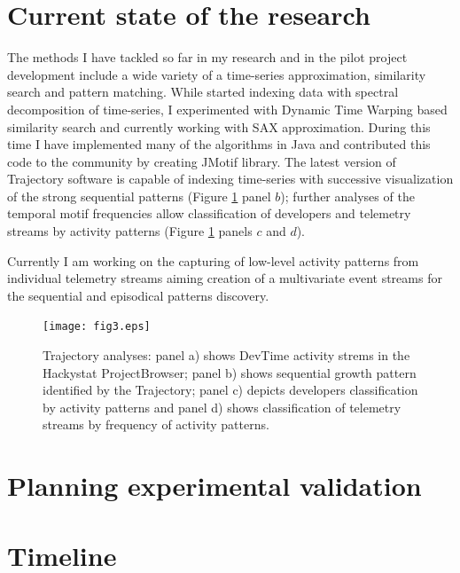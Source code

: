 \documentclass[11pt,oneside]{article}
\begin{document}
\section{Current state of the research}
The methods I have tackled so far in my research and in the pilot project development include a wide variety of a time-series approximation, similarity search and pattern matching. While started indexing data with spectral decomposition of time-series, I experimented with Dynamic Time Warping based similarity search and currently working with SAX approximation. During this time I have implemented many of the algorithms in Java and contributed this code to the community by creating JMotif library. The latest version of Trajectory software is capable of indexing time-series with successive visualization of the strong sequential patterns (Figure \ref{fig:fig3} panel $b$); further analyses of the temporal motif frequencies allow classification of developers and telemetry streams by activity patterns (Figure \ref{fig:fig3} panels $c$ and $d$). 

Currently I am working on the capturing of low-level activity patterns from individual telemetry streams aiming creation of a multivariate event streams for the sequential and episodical patterns discovery.

\begin{figure}[tbp]
   \centering
   \texttt{[image: fig3.eps]}
   \caption{Trajectory analyses: panel a) shows DevTime activity strems in the Hackystat ProjectBrowser; panel b) shows sequential growth pattern identified by the Trajectory; panel c) depicts developers classification by activity patterns and panel d) shows classification of telemetry streams by frequency of activity patterns.}
   \label{fig:fig3}
\end{figure}

\section{Planning experimental validation}


\section{Timeline}



\end{document}
